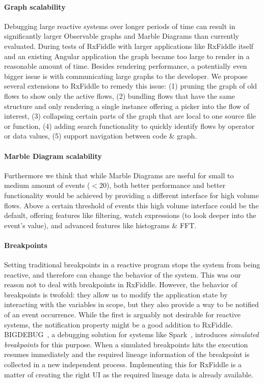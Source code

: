\paragraph{Graph scalability}
Debugging large reactive systems over longer periods of time can result in significantly larger Observable graphs and Marble Diagrams than currently evaluated. During tests of RxFiddle with larger applications like RxFiddle itself and an existing Angular application the graph became too large to render in a reasonable amount of time. Besides rendering performance, a potentially even bigger issue is with communicating large graphs to the developer. We propose several extensions to RxFiddle to remedy this issue: (1) pruning the graph of old flows to show only the active flows, (2) bundling flows that have the same structure and only rendering a single instance offering a picker into the flow of interest, (3) collapsing certain parts of the graph that are local to one source file or function, (4) adding search functionality to quickly identify flows by operator or data values, (5) support navigation between code \& graph.

\paragraph{Marble Diagram scalability}
Furthermore we think that while Marble Diagrams are useful for small to medium amount of events ($< 20$), both better performance and better functionality would be achieved by providing a different interface for high volume flows. Above a certain threshold of events this high volume interface could be the default, offering features like filtering, watch expressions (to look deeper into the event's value), and advanced features like histograms \& FFT.

\paragraph{Breakpoints}
\label{breakpoints}
Setting traditional breakpoints in a reactive program stops the system from being reactive, and therefore can change the behavior of the system. This was our reason not to deal with breakpoints in RxFiddle. However, the behavior of breakpoints is twofold: they allow us to modify the application state by interacting with the variables in scope, but they also provide a way to be notified of an event occurrence. While the first is arguably not desirable for reactive systems, the notification property might be a good addition to RxFiddle. BIGDEBUG~\cite{Gulzar2016}, a debugging solution for systems like Spark~\cite{zaharia2012resilient}, introduces \textit{simulated breakpoints} for this purpose. When a simulated breakpoints hits the execution resumes immediately and the required lineage information of the breakpoint is collected in a new independent process. Implementing this for RxFiddle is a matter of creating the right UI as the required lineage data is already available.

